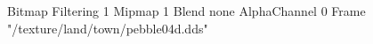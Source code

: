 {Bitmap
	{Filtering 1}
	{Mipmap 1}
	{Blend none}
	{AlphaChannel 0}
	{Frame "/texture/land/town/pebble04d.dds"}
}
